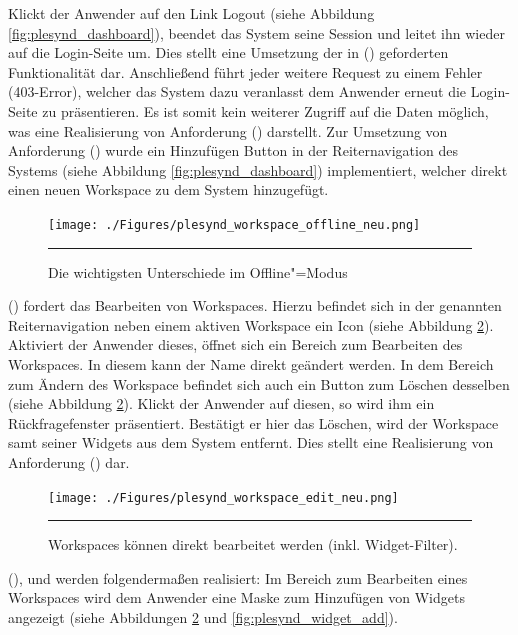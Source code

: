 Klickt der Anwender auf den Link Logout (siehe Abbildung \ref{fig:plesynd_dashboard}), beendet das System seine Session und leitet ihn wieder auf die Login-Seite um. Dies stellt eine Umsetzung der in  (\emph{\requirementLogout}) geforderten Funktionalität dar. Anschließend führt jeder weitere Request zu einem Fehler (403-Error), welcher das System dazu veranlasst dem Anwender erneut die Login-Seite zu präsentieren. Es ist somit kein weiterer Zugriff auf die Daten möglich, was eine Realisierung von Anforderung  (\emph{\requirementKeinZugriffNachLogout}) darstellt. Zur Umsetzung von Anforderung  (\emph{\requirementWorkspaceAdd}) wurde ein Hinzufügen Button in der Reiternavigation des Systems (siehe Abbildung \ref{fig:plesynd_dashboard}) implementiert, welcher direkt einen neuen Workspace zu dem System hinzugefügt.
\begin{figure}[!ht]
  \centering
  \texttt{[image: ./Figures/plesynd\_workspace\_offline\_neu.png]}
    \rule{35em}{0.5pt}
  \caption[Plesynd User"=Interface: Workspace Offline]{Die wichtigsten Unterschiede im Offline"=Modus}
  \label{fig:plesynd_workspace_offline}
\end{figure}
 (\emph{\requirementWorkspaceEdit}) fordert das Bearbeiten von Workspaces. Hierzu befindet sich in der genannten Reiternavigation neben einem aktiven Workspace ein Icon (siehe Abbildung \ref{fig:plesynd_workspace_edit}). Aktiviert der Anwender dieses, öffnet sich ein Bereich zum Bearbeiten des Workspaces. In diesem kann der Name direkt geändert werden. In dem Bereich zum Ändern des Workspace befindet sich auch ein Button zum Löschen desselben (siehe Abbildung \ref{fig:plesynd_workspace_edit}).
Klickt der Anwender auf diesen, so wird ihm ein Rückfragefenster präsentiert. Bestätigt er hier das Löschen, wird der Workspace samt seiner Widgets aus dem System entfernt. Dies stellt eine Realisierung von Anforderung  (\emph{\requirementWorkspaceDelete}) dar.
\begin{figure}
  \centering
  \texttt{[image: ./Figures/plesynd\_workspace\_edit\_neu.png]}
    \rule{35em}{0.5pt}
  \caption[Plesynd User"=Interface: Bearbeiten von Workspaces]{Workspaces können direkt bearbeitet werden (inkl. Widget-Filter).}
  \label{fig:plesynd_workspace_edit}
\end{figure}
 (\emph{\requirementWidgetAdd}),  \emph{\requirementWidgetFilterName} und  \emph{\requirementWidgetFilterOnline} werden folgendermaßen realisiert: Im Bereich zum Bearbeiten eines Workspaces wird dem Anwender eine Maske zum Hinzufügen von Widgets angezeigt (siehe Abbildungen \ref{fig:plesynd_workspace_edit} und \ref{fig:plesynd_widget_add}). 
